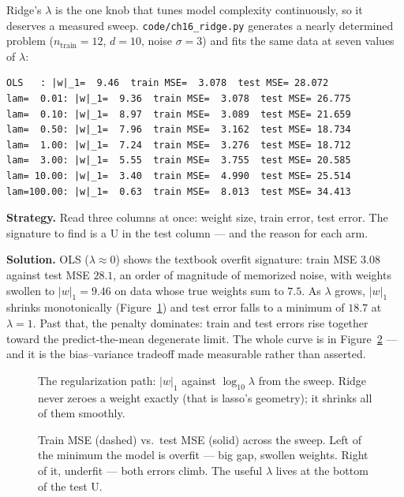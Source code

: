 Ridge's $\lambda$ is the one knob that
tunes model complexity continuously, so it deserves a measured
sweep. \texttt{code/ch16\_ridge.py} generates a nearly determined
problem ($n_\text{train}=12$, $d=10$, noise $\sigma=3$) and fits the
same data at seven values of $\lambda$:

\begin{lstlisting}[caption={\ttfamily code/ch16\_ridge.py run ---
the sweep, real numbers}]
OLS   : |w|_1=  9.46  train MSE=  3.078  test MSE= 28.072
lam=  0.01: |w|_1=  9.36  train MSE=  3.078  test MSE= 26.775
lam=  0.10: |w|_1=  8.97  train MSE=  3.089  test MSE= 21.659
lam=  0.50: |w|_1=  7.96  train MSE=  3.162  test MSE= 18.734
lam=  1.00: |w|_1=  7.24  train MSE=  3.276  test MSE= 18.712
lam=  3.00: |w|_1=  5.55  train MSE=  3.755  test MSE= 20.585
lam= 10.00: |w|_1=  3.40  train MSE=  4.990  test MSE= 25.514
lam=100.00: |w|_1=  0.63  train MSE=  8.013  test MSE= 34.413
\end{lstlisting}

\begin{example}\label{ex:sweep}
\textbf{Strategy.} Read three columns at once: weight size, train
error, test error. The signature to find is a U in the test column
--- and the reason for each arm.

\textbf{Solution.} OLS ($\lambda\approx0$) shows the textbook
overfit signature: train MSE $3.08$ against test MSE $28.1$, an
order of magnitude of memorized noise, with weights swollen to
$|w|_1=9.46$ on data whose true weights sum to $7.5$. As $\lambda$
grows, $|w|_1$ shrinks monotonically (Figure~\ref{fig:ridgepath})
and test error falls to a minimum of $18.7$ at $\lambda=1$. Past
that, the penalty dominates: train and test errors rise together
toward the predict-the-mean degenerate limit. The whole curve is in
Figure~\ref{fig:biasvar} --- and it is the bias--variance tradeoff
made measurable rather than asserted.
\end{example}

\begin{figure}[htbp]
\centering

\caption{The regularization path: $|w|_1$ against $\log_{10}\lambda$
from the sweep. Ridge never zeroes a weight exactly (that is lasso's
geometry); it shrinks all of them smoothly.}
\label{fig:ridgepath}
\end{figure}

\begin{figure}[htbp]
\centering

\caption{Train MSE (dashed) vs.\ test MSE (solid) across the sweep.
Left of the minimum the model is overfit --- big gap, swollen
weights. Right of it, underfit --- both errors climb. The useful
$\lambda$ lives at the bottom of the test U.}
\label{fig:biasvar}
\end{figure}


